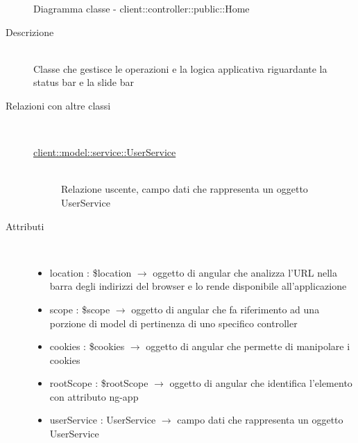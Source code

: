 \vspace{0.5cm}
\hypertarget{client::controller::public::Home}{}
\begin{figure}[H]
	\centering
	\caption{Diagramma classe - client::controller::public::Home}
\end{figure}\begin{description}
\item[Descrizione] \hfill \\
Classe che gestisce le operazioni e la logica applicativa riguardante la status bar e la slide bar
\item[Relazioni con altre classi] \hfill \\
\vspace{-7mm}
\begin{description}
	\item[\hyperlink{client::model::service::UserService}{client::model::service::UserService}] \hfill \\
	Relazione uscente, campo dati che rappresenta un oggetto UserService
\end{description}

\item[Attributi] \hfill \\
\vspace{-7mm}
\begin{itemize}
	\item location : \$location $\rightarrow$ oggetto di angular che analizza l'URL nella barra degli indirizzi del browser e lo rende disponibile all'applicazione
	\item scope : \$scope $\rightarrow$ oggetto di angular che fa riferimento ad una porzione di model di pertinenza di uno specifico controller
	\item cookies : \$cookies $\rightarrow$ oggetto di angular che permette di manipolare i cookies
	\item rootScope : \$rootScope $\rightarrow$ oggetto di angular che identifica l’elemento con attributo ng-app
	\item userService : UserService $\rightarrow$ campo dati che rappresenta un oggetto UserService
\end{itemize}


\end{description}
